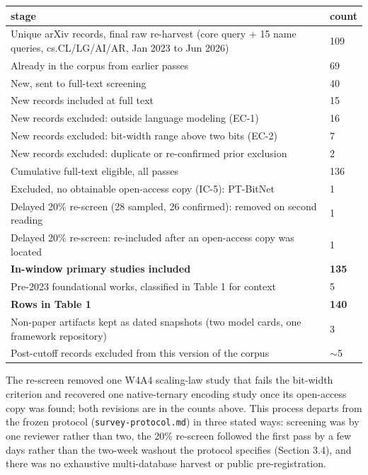 \documentclass[11pt]{article}
\begin{document}
\begin{center}\footnotesize
{}\par\medskip
\begin{tabularx}{\linewidth}{Ll}\toprule
stage & count \\
\midrule
Unique arXiv records, final raw re-harvest (core query + 15 name queries, cs.CL/LG/AI/AR, Jan 2023 to Jun 2026) & 109 \\
Already in the corpus from earlier passes & 69 \\
New, sent to full-text screening & 40 \\
New records included at full text & 15 \\
New records excluded: outside language modeling (EC-1) & 16 \\
New records excluded: bit-width range above two bits (EC-2) & 7 \\
New records excluded: duplicate or re-confirmed prior exclusion & 2 \\
Cumulative full-text eligible, all passes & 136 \\
Excluded, no obtainable open-access copy (IC-5): PT-BitNet & 1 \\
Delayed 20\% re-screen (28 sampled, 26 confirmed): removed on second reading & 1 \\
Delayed 20\% re-screen: re-included after an open-access copy was located & 1 \\
\textbf{In-window primary studies included} & \textbf{135} \\
Pre-2023 foundational works, classified in Table 1 for context & 5 \\
\textbf{Rows in Table 1} & \textbf{140} \\
Non-paper artifacts kept as dated snapshots (two model cards, one framework repository) & 3 \\
Post-cutoff records excluded from this version of the corpus & $\sim$5 \\
\bottomrule\end{tabularx}\end{center}

The re-screen removed one W4A4 scaling-law study that fails the bit-width criterion and
recovered one native-ternary encoding study once its open-access copy was found; both
revisions are in the counts above. This process departs from the frozen protocol
(\texttt{survey-protocol.md}) in three stated ways: screening was by one reviewer rather than
two, the 20\% re-screen followed the first pass by a few days rather than the two-week
washout the protocol specifies (Section 3.4), and there was no exhaustive multi-database
harvest or public pre-registration.
\end{document}
